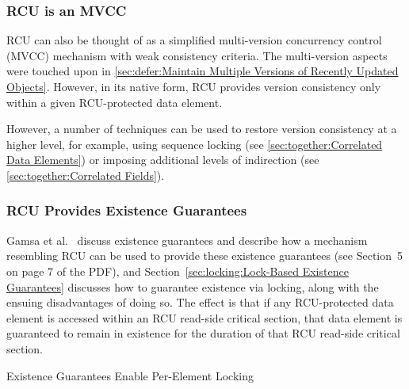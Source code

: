 \subsubsection{RCU is an MVCC}
\label{sec:defer:RCU is an MVCC}

RCU can also be thought of as a simplified multi-version concurrency
control (MVCC) mechanism with weak consistency criteria.
The multi-version aspects were touched upon in
\cref{sec:defer:Maintain Multiple Versions of Recently Updated Objects}.
However, in its native form, RCU provides version consistency only
within a given RCU-protected data element.

However, a number of techniques can be used to restore version consistency
at a higher level, for example, using sequence locking
(see \cref{sec:together:Correlated Data Elements})
or imposing additional levels of indirection
(see \cref{sec:together:Correlated Fields}).

\subsubsection{RCU Provides Existence Guarantees}
\label{sec:defer:RCU Provides Existence Guarantees}

Gamsa et al.~\cite{Gamsa99}
discuss existence guarantees and describe how a mechanism
resembling RCU can be used to provide these existence guarantees
(see Section~5 on page 7 of the PDF), and
Section~\ref{sec:locking:Lock-Based Existence Guarantees}
discusses how to guarantee existence via locking, along with the
ensuing disadvantages of doing so.
The effect is that if any RCU-protected data element is accessed
within an RCU read-side critical section, that data element is
guaranteed to remain in existence for the duration of that RCU
read-side critical section.

\begin{listing}[tbp]
\begin{fcvlabel}
\end{fcvlabel}
\caption{Existence Guarantees Enable Per-Element Locking}
\label{lst:defer:Existence Guarantees Enable Per-Element Locking}
\end{listing}

